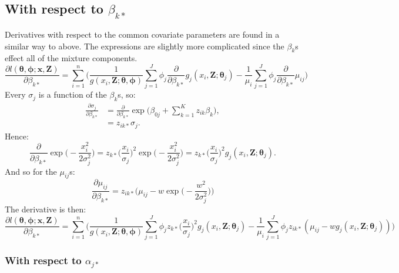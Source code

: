 \documentclass[10pt]{article}
\begin{document}
\subsection*{With respect to $\beta_{k*}$}

Derivatives with respect to the common covariate parameters are found in a similar way to above. The expressions are slightly more complicated since the $\beta_k$s effect all of the mixture components.
\begin{equation*}
\frac{\partial l(\boldsymbol{\theta},\boldsymbol{\phi}; \mathbf{x},\mathbf{Z})}{\partial \beta_{k*}} = \sum_{i=1}^n \Big( \frac{1}{g(x_i,\mathbf{Z}; \boldsymbol{\theta},\boldsymbol{\phi})} \sum_{j=1}^J \phi_j \frac{\partial}{\partial \beta_{k*}} g_j(x_i,\mathbf{Z}; \boldsymbol{\theta}_j) - \frac{1}{\mu_i} \sum_{j=1}^J \phi_j \frac{\partial}{\partial \beta_{k*}}\mu_{ij}\Big)
\end{equation*}
Every $\sigma_{j}$ is a function of the $\beta_{k}$s, so:
\begin{align*}
\frac{\partial \sigma_{j}}{\partial \beta_{k*}} &= \frac{\partial}{\partial \beta_{k*}} \exp \Big( \beta_{0j} + \sum_{k=1}^K z_{ik} \beta_{k}\Big),\\
&= z_{ik*}\sigma_{j}.
\end{align*}
Hence:
\begin{equation}
 \frac{\partial}{\partial \beta_{k*}} \exp\Big( -\frac{x_i^2}{2\sigma_{j}^2} \Big) = z_{k*} \Big( \frac{x_i}{\sigma_{j}}\Big)^2 \exp \Big(-\frac{x_i^2}{2 \sigma_{j}^2}\Big) = z_{k*} \Big( \frac{x_i}{\sigma_{j}}\Big)^2 g_j(x_i,\mathbf{Z}; \boldsymbol{\theta}_j).
 \label{detfct-deriv-k}
\end{equation}
And so for the $\mu_{ij}$s:
\begin{equation*}
\frac{\partial \mu_{ij}}{\partial \beta_{k*}} = z_{ik*} \Big( \mu_{ij} - w \exp\Big( -\frac{w^2}{2\sigma_{j}^2} \Big) \Big)
\end{equation*}
The derivative is then:
\begin{equation*}
\frac{\partial l(\boldsymbol{\theta},\boldsymbol{\phi}; \mathbf{x},\mathbf{Z})}{\partial \beta_{k*}} = \sum_{i=1}^n \Big( \frac{1}{g(x_i,\mathbf{Z}; \boldsymbol{\theta},\boldsymbol{\phi})} \sum_{j=1}^J \phi_j  z_{k*} \Big( \frac{x_i}{\sigma_{j}}\Big)^2 g_j(x_i,\mathbf{Z}; \boldsymbol{\theta}_j) - \frac{1}{\mu_i} \sum_{j=1}^J \phi_j z_{ik*} ( \mu_{ij} - w g_j(x_i,\mathbf{Z}; \boldsymbol{\theta}_j) )\Big)
\end{equation*}

\subsubsection*{With respect to $\alpha_{j*}$}
\end{document}
